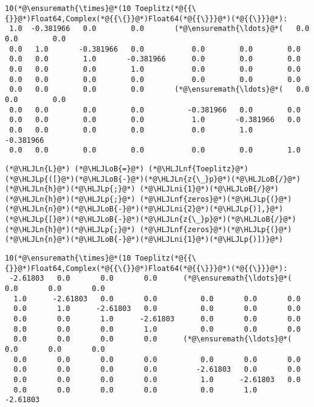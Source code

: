 \documentclass[12pt,landscape]{article}
\newcommand{\HLJLn}[1]{#1}
\newcommand{\HLJLnf}[1]{\textcolor[RGB]{66,102,213}{#1}}
\newcommand{\HLJLni}[1]{\textcolor[RGB]{59,151,46}{#1}}
\newcommand{\HLJLoB}[1]{\textcolor[RGB]{102,102,102}{\textbf{#1}}}
\newcommand{\HLJLp}[1]{#1}
\begin{document}
{\begin{lstlisting}
10(*@\ensuremath{\times}@*(10 Toeplitz(*@{{\{}}@*)Float64,Complex(*@{{\{}}@*)Float64(*@{{\}}}@*)(*@{{\}}}@*):
 1.0  -0.381966   0.0        0.0       (*@\ensuremath{\ldots}@*(   0.0        0.0        0.0
 0.0   1.0       -0.381966   0.0           0.0        0.0        0.0
 0.0   0.0        1.0       -0.381966      0.0        0.0        0.0
 0.0   0.0        0.0        1.0           0.0        0.0        0.0
 0.0   0.0        0.0        0.0           0.0        0.0        0.0
 0.0   0.0        0.0        0.0       (*@\ensuremath{\ldots}@*(   0.0        0.0        0.0
 0.0   0.0        0.0        0.0          -0.381966   0.0        0.0
 0.0   0.0        0.0        0.0           1.0       -0.381966   0.0
 0.0   0.0        0.0        0.0           0.0        1.0       -0.381966
 0.0   0.0        0.0        0.0           0.0        0.0        1.0
\end{lstlisting}


\begin{lstlisting}
(*@\HLJLn{L}@*) (*@\HLJLoB{=}@*) (*@\HLJLnf{Toeplitz}@*)(*@\HLJLp{([}@*)(*@\HLJLoB{-}@*)(*@\HLJLn{z{\_}p}@*)(*@\HLJLoB{/}@*)(*@\HLJLn{h}@*)(*@\HLJLp{;}@*) (*@\HLJLni{1}@*)(*@\HLJLoB{/}@*)(*@\HLJLn{h}@*)(*@\HLJLp{;}@*) (*@\HLJLnf{zeros}@*)(*@\HLJLp{(}@*)(*@\HLJLn{n}@*)(*@\HLJLoB{-}@*)(*@\HLJLni{2}@*)(*@\HLJLp{)],}@*) (*@\HLJLp{[}@*)(*@\HLJLoB{-}@*)(*@\HLJLn{z{\_}p}@*)(*@\HLJLoB{/}@*)(*@\HLJLn{h}@*)(*@\HLJLp{;}@*) (*@\HLJLnf{zeros}@*)(*@\HLJLp{(}@*)(*@\HLJLn{n}@*)(*@\HLJLoB{-}@*)(*@\HLJLni{1}@*)(*@\HLJLp{)])}@*)
\end{lstlisting}

\begin{lstlisting}
10(*@\ensuremath{\times}@*(10 Toeplitz(*@{{\{}}@*)Float64,Complex(*@{{\{}}@*)Float64(*@{{\}}}@*)(*@{{\}}}@*):
 -2.61803   0.0       0.0       0.0      (*@\ensuremath{\ldots}@*(   0.0       0.0       0.0
  1.0      -2.61803   0.0       0.0          0.0       0.0       0.0
  0.0       1.0      -2.61803   0.0          0.0       0.0       0.0
  0.0       0.0       1.0      -2.61803      0.0       0.0       0.0
  0.0       0.0       0.0       1.0          0.0       0.0       0.0
  0.0       0.0       0.0       0.0      (*@\ensuremath{\ldots}@*(   0.0       0.0       0.0
  0.0       0.0       0.0       0.0          0.0       0.0       0.0
  0.0       0.0       0.0       0.0         -2.61803   0.0       0.0
  0.0       0.0       0.0       0.0          1.0      -2.61803   0.0
  0.0       0.0       0.0       0.0          0.0       1.0      -2.61803
\end{lstlisting}


}
\end{document}
